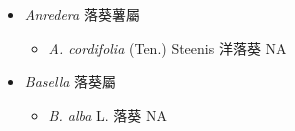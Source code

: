 
  \begin{itemize}
 \item[] \textit{Anredera} 落葵薯屬
                                
  \begin{itemize}
        \item[] \textit{A. cordifolia} (Ten.) Steenis  洋落葵   NA
  \end{itemize}
 \item[] \textit{Basella} 落葵屬
                                
  \begin{itemize}
        \item[] \textit{B. alba} L.  落葵   NA
  \end{itemize}
  \end{itemize}
